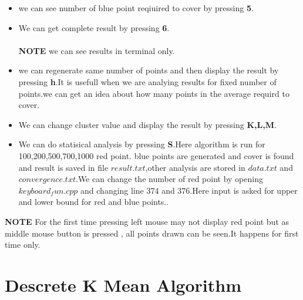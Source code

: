 \documentclass[a4paper,10pt]{report}
\begin{document}
\begin{itemize}
 \item we can see number of blue point reqiuired to cover by pressing \textbf{5}.
 \item We can get complete result by pressing \textbf{6}.\\ \\
 \textbf{NOTE} we can see results in terminal only.
 \item we can regenerate same number of points and then display the result by pressing \textbf{h}.It is usefull when we 
 are analying results for fixed number of points.we can get an idea about how many points in the average requird to cover.
 \item We can change cluster value and display the result by pressing \textbf{K,L,M}.
 \item We can do statisical analysis by pressing \textbf{S}.Here algorithm is run for 100,200,500,700,1000 red point.
 blue points are generated and cover is found and result is saved in file $result.txt$,other analysis are stored in
 $data.txt$ and $convergence.txt$.We can change the number of red point by opening $keyboard_fun.cpp$ and changing line
 374 and 376.Here input is asked for upper and lower bound for red and blue points..
 \end{itemize}
 

 \textbf{NOTE} For the first time pressing left mouse may not display red point but as middle mouse button 
 is pressed , all points drawn can be seen.It happens for first time only.



\clearpage

\clearpage
\section{Descrete K Mean Algorithm}
\end{document}

